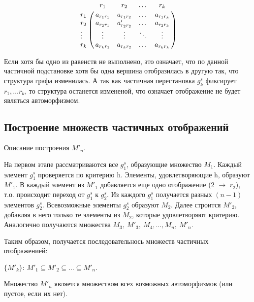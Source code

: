 \[ \bordermatrix{
& r_1 & r_2 & \dots & r_k \cr
r_1 & a_{r_1r_1} & a_{r_1r_2} & \dots & a_{r_1r_k} \cr
r_2 & a_{r_2r_1} & a'_{r_2r_2} & \dots & a_{r_2r_k} \cr
\vdots & \vdots & \vdots & \ddots & \vdots \cr
r_k & a_{r_kr_1} & a_{r_kr_2} & \dots & a_{r_kr_k} \cr}
\]

Если хотя бы одно из равенств не выполнено, это означает, что по данной частичной подстановке хотя бы одна вершина отобразилась в другую так, что структура графа изменилась. А так как частичная перестановка $g^s_k$ фиксирует $r_1, \ldots r_k$, то структура останется измененой, что означает отображение не будет являться автоморфизмом.



\subsection{Построение множеств частичных отображений}

Описание построения $M'_n$.

На первом этапе рассматриваются все $g^s_1$, образующие множество $M_1$. Каждый элемент $g^s_1$ проверяется по критерию h. Элементы, удовлетворяющие h, образуют $M'_1$. В каждый элемент из $M'_1$ добавляется еще одно отображение (2 $\to$ $r_2$), т.о. происходит переход от $g^s_1$ к $g^s_2$. Из каждого $g^s_1$ получается разных $(n-1)$ элементов $g^s_2$. Всевозможные элементы $g^s_2$ образуют $M_2$. Далее строится $M'_2$, добавляя в него только те элементы из $M_2$, которые удовлетворяют критерию. Аналогично получаются множества $M_3,\ M'_3,\ M_4,\ldots, M_n,\ M'_n$.


Таким образом, получается последовательнось множеств частичных отображенией:

$\{M'_k\}$: $M'_1 \subseteq M'_2 \subseteq \ldots \subseteq M'_n$.

Множество $M'_n$ является множеством всех возможных автоморфизмов (или пустое, если их нет).




